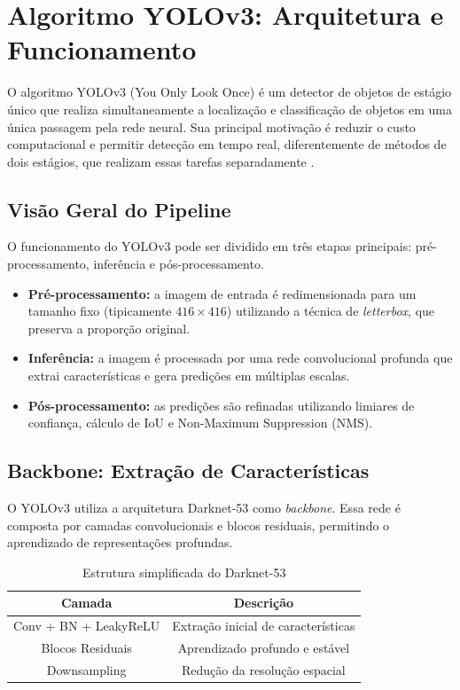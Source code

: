 \documentclass[conference]{IEEEtran}
\begin{document}
\section{Algoritmo YOLOv3: Arquitetura e Funcionamento}

O algoritmo YOLOv3 (You Only Look Once) é um detector de objetos de estágio único que realiza simultaneamente a localização e classificação de objetos em uma única passagem pela rede neural. Sua principal motivação é reduzir o custo computacional e permitir detecção em tempo real, diferentemente de métodos de dois estágios, que realizam essas tarefas separadamente \cite{redmon2018yolov3}.

\subsection{Visão Geral do Pipeline}

O funcionamento do YOLOv3 pode ser dividido em três etapas principais: pré-processamento, inferência e pós-processamento.

\begin{itemize}
    \item \textbf{Pré-processamento:} a imagem de entrada é redimensionada para um tamanho fixo (tipicamente $416 \times 416$) utilizando a técnica de \textit{letterbox}, que preserva a proporção original.
    \item \textbf{Inferência:} a imagem é processada por uma rede convolucional profunda que extrai características e gera predições em múltiplas escalas.
    \item \textbf{Pós-processamento:} as predições são refinadas utilizando limiares de confiança, cálculo de IoU e Non-Maximum Suppression (NMS).
\end{itemize}

\subsection{Backbone: Extração de Características}

O YOLOv3 utiliza a arquitetura Darknet-53 como \textit{backbone}. Essa rede é composta por camadas convolucionais e blocos residuais, permitindo o aprendizado de representações profundas.

\begin{table}[h]
\centering
\caption{Estrutura simplificada do Darknet-53}
\begin{tabular}{|c|c|}
\hline
\textbf{Camada} & \textbf{Descrição} \\
\hline
Conv + BN + LeakyReLU & Extração inicial de características \\
Blocos Residuais & Aprendizado profundo e estável \\
Downsampling & Redução da resolução espacial \\
\hline
\end{tabular}
\end{table}
\end{document}
